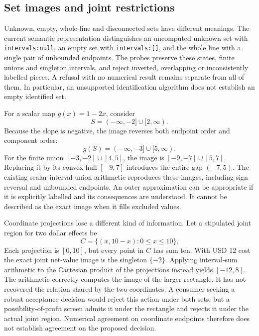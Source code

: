 \subsection{Set images and joint restrictions}

Unknown, empty, whole-line and disconnected sets have different meanings.
The current semantic representation distinguishes an uncomputed unknown set
with \texttt{intervals:null}, an empty set with \texttt{intervals:[]}, and the
whole line with a single pair of unbounded endpoints. The probes preserve
these states, finite unions and singleton intervals, and reject inverted,
overlapping or inconsistently labelled pieces. A refusal with no numerical
result remains separate from all of them. In particular, an unsupported
identification algorithm does not establish an empty identified set.
\citep{exec16_topology_runtime}

For a scalar map \(g(x)=1-2x\), consider
\[
 S=(-\infty,-2]\cup[2,\infty).
\]
Because the slope is negative, the image reverses both endpoint order and
component order:
\[
 g(S)=(-\infty,-3]\cup[5,\infty).
\]
For the finite union \([-3,-2]\cup[4,5]\), the image is
\([-9,-7]\cup[5,7]\). Replacing it by its convex hull \([-9,7]\) introduces
the entire gap \((-7,5)\). The existing scalar interval-union arithmetic
reproduces these images, including sign reversal and unbounded endpoints.
An outer approximation can be appropriate if it is explicitly labelled and
its consequences are understood. It cannot be described as the exact image
when it fills excluded values.
\citep{exec16_topology_exact}

Coordinate projections lose a different kind of information. Let a stipulated
joint region for two dollar effects be
\[
 C=\{(x,10-x):0\leq x\leq10\}.
\]
Each projection is \([0,10]\), but every point in \(C\) has sum ten. With
USD 12 cost the exact joint net-value image is the singleton \(\{-2\}\).
Applying interval-sum arithmetic to the Cartesian product of the projections
instead yields \([-12,8]\). The arithmetic correctly computes the image of
the larger rectangle. It has not recovered the relation shared by the two
coordinates. A consumer seeking a robust acceptance decision would reject
this action under both sets, but a possibility-of-profit screen admits it
under the rectangle and rejects it under the actual joint region. Numerical
agreement on coordinate endpoints therefore does not establish agreement on
the proposed decision.
\citep{exec16_topology_exact}

